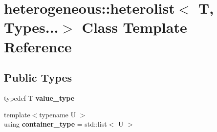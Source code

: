 \hypertarget{classheterogeneous_1_1heterolist_3_01_t_00_01_types_8_8_8_4}{}\section{heterogeneous\+:\+:heterolist$<$ T, Types...$>$ Class Template Reference}
\label{classheterogeneous_1_1heterolist_3_01_t_00_01_types_8_8_8_4}
\subsection*{Public Types}
\begin{DoxyCompactItemize}
\item 
\hypertarget{classheterogeneous_1_1heterolist_3_01_t_00_01_types_8_8_8_4_a1033c1533c8a423035429b8980062f1a}{}typedef T {\bfseries value\+\_\+type}\label{classheterogeneous_1_1heterolist_3_01_t_00_01_types_8_8_8_4_a1033c1533c8a423035429b8980062f1a}

\item 
\hypertarget{classheterogeneous_1_1heterolist_3_01_t_00_01_types_8_8_8_4_a25a4b391de114010d1f4f9f4dbc32193}{}{\footnotesize template$<$typename U $>$ }\\using {\bfseries container\+\_\+type} = std\+::list$<$ U $>$\label{classheterogeneous_1_1heterolist_3_01_t_00_01_types_8_8_8_4_a25a4b391de114010d1f4f9f4dbc32193}

\end{DoxyCompactItemize}
